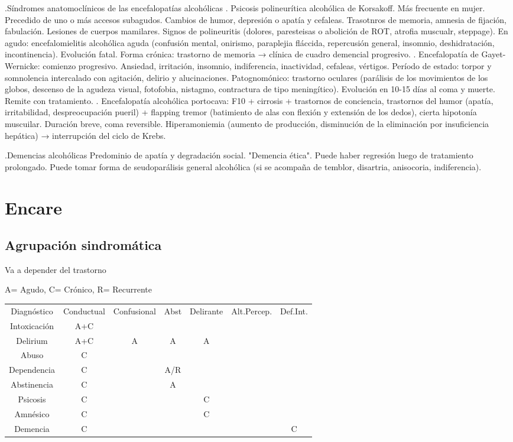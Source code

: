 \documentclass{scrbook}
\begin{document}
.Síndromes anatomoclínicos de las encefalopatías alcohólicas
. Psicosis polineurítica alcohólica de Korsakoff. Más frecuente en mujer. Precedido de uno o más accesos subagudos. Cambios de humor, depresión o apatía y cefaleas. Trasotnros de memoria, amnesia de fijación, fabulación. Lesiones de cuerpos mamilares. Signos de polineuritis (dolores, paresteisas o abolición de ROT, atrofia muscualr, steppage). En agudo: encefalomielitis alcohólica aguda (confusión mental, onirismo, paraplejia fláccida, repercusión general, insomnio, deshidratación, incontinencia). Evolución fatal. Forma crónica: trastorno de memoria → clínica de cuadro demencial progresivo.
. Encefalopatía de Gayet-Wernicke: comienzo progresivo. Ansiedad, irritación, insomnio, indiferencia, inactividad, cefaleas, vértigos. Período de estado: torpor y somnolencia intercalado con agitación, delirio y alucinaciones. Patognomónico: trastorno oculares (parálisis de los movimientos de los globos, descenso de la agudeza visual, fotofobia, nistagmo, contractura de tipo meningítico). Evolución en 10-15 días al coma y muerte. Remite con tratamiento.
. Encefalopatía alcohólica portocava: F10 + cirrosis + trastornos de conciencia, trastornos del humor (apatía, irritabilidad, despreocupación pueril) + flapping tremor (batimiento de alas con flexión y extensión de los dedos), cierta hipotonía muscuilar. Duración breve, coma reversible. Hiperamoniemia (aumento de producción, disminución de la eliminación por insuficiencia hepática) → interrupción del ciclo de Krebs.

.Demencias alcohólicas
Predominio de apatía y degradación social. "Demencia ética". Puede haber regresión luego de tratamiento prolongado. Puede tomar forma de seudoparálisis general alcohólica (si se acompaña de temblor, disartria, anisocoria, indiferencia).
\section*{Encare}
\subsection*{Agrupación sindromática}
Va a depender del trastorno

A= Agudo, C= Crónico, R= Recurrente
\begin{center}
\begin{tabular}{|c|c|c|c|c|c|c|}
\hline
Diagnóstico & Conductual & Confusional & Abst & Delirante & Alt.Percep. & Def.Int.\\
Intoxicación & A+C &  & & &\\
Delirium & A+C & A & A & A\\
Abuso & C & & & &\\
Dependencia & C &  & A/R & & \\
Abstinencia & C & & A\\
Psicosis & C & & & C\\
Amnésico & C & & & C\\
Demencia & C & & & & & C\\
\hline
\end{tabular}
\end{center}
\end{document}
